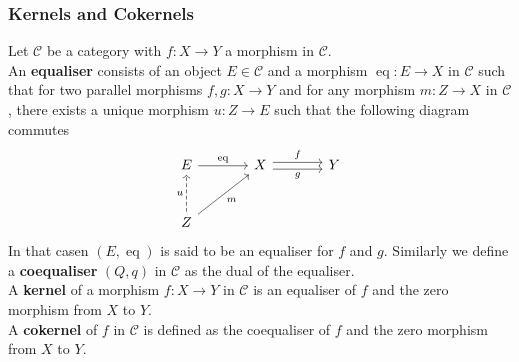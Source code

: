 \documentclass{article}
\theoremstyle{plain}
\newtheorem{proposition}[theorem]{Proposition}
\theoremstyle{definition}
\DeclareMathOperator{\eq}{eq}
\begin{document}

\subsubsection*{Kernels and Cokernels}


Let $\mathcal{C}$ be a category with $f:X\rightarrow Y$ a morphism in $\mathcal{C}$.\\
An \textbf{equaliser} consists of an object $E\in \mathcal{C}$ and a morphism $\eq:E\rightarrow X$ in $\mathcal{C}$ such that for two parallel morphisms $f,g:X\rightarrow Y$ and for any morphism $m:Z\rightarrow X$ in $\mathcal{C}$, there exists a unique morphism $u:Z\rightarrow E$ such that the following diagram commutes 
\[
\begin{tikzcd}[column sep=large, row sep = large]
        E \arrow[r,"\eq"] &
        X  \arrow[r, shift left, "f"] \arrow[r, shift right, "g"']  & 
        Y\\
        Z \arrow[u, dashed, "u"] \arrow[ur, "m"']
\end{tikzcd}
\]
In that casen $(E,\eq)$ is said to be an equaliser for $f$ and $g$.
Similarly we define a \textbf{coequaliser} $(Q,q)$ in $\mathcal{C}$ as the dual of the equaliser.\\
A \textbf{kernel} of a morphism $f:X\rightarrow Y$ in $\mathcal{C}$ is an equaliser of $f$ and the zero morphism from $X$ to $Y$.\\
A \textbf{cokernel} of $f$ in $\mathcal{C}$ is defined as the coequaliser of $f$ and the zero morphism from $X$ to $Y$.
\end{document}

